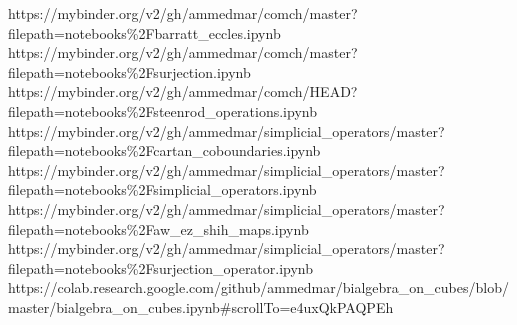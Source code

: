 		{https://mybinder.org/v2/gh/ammedmar/comch/master?filepath=notebooks\%2Fbarratt_eccles.ipynb}
		{https://mybinder.org/v2/gh/ammedmar/comch/master?filepath=notebooks\%2Fsurjection.ipynb}
		{https://mybinder.org/v2/gh/ammedmar/comch/HEAD?filepath=notebooks\%2Fsteenrod_operations.ipynb}
		{https://mybinder.org/v2/gh/ammedmar/simplicial_operators/master?filepath=notebooks\%2Fcartan_coboundaries.ipynb}
		{https://mybinder.org/v2/gh/ammedmar/simplicial_operators/master?filepath=notebooks\%2Fsimplicial_operators.ipynb}
		{https://mybinder.org/v2/gh/ammedmar/simplicial_operators/master?filepath=notebooks\%2Faw_ez_shih_maps.ipynb}
		{https://mybinder.org/v2/gh/ammedmar/simplicial_operators/master?filepath=notebooks\%2Fsurjection_operator.ipynb}
		{https://colab.research.google.com/github/ammedmar/bialgebra_on_cubes/blob/master/bialgebra_on_cubes.ipynb\#scrollTo=e4uxQkPAQPEh}
